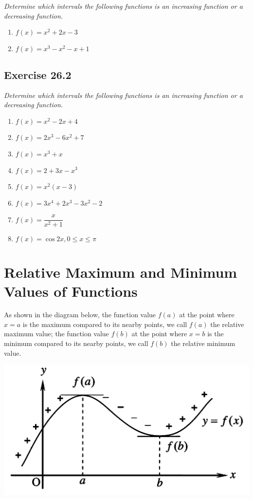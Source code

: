 \documentclass{report}
\begin{document}
\noindent \hspace{1.2em}\textit{
    Determine which intervals the following functions is an increasing function or a decreasing function.
}
\begin{enumerate}
    \item $f(x)=x^2+2 x-3$
    \item $f(x)=x^3-x^2-x+1$
\end{enumerate}

\subsection{Exercise 26.2}

\noindent \hspace{1.2em}\textit{Determine which intervals the following functions is an increasing function or a decreasing function.}
\begin{enumerate}
    \item $f(x)=x^2-2 x+4$
    \item $f(x)=2 x^3-6 x^2+7$
    \item $f(x)=x^3+x$
    \item $f(x)=2+3 x-x^3$
    \item $f(x)=x^2(x-3)$
    \item $f(x)=3 x^4+2 x^3-3 x^2-2$
    \item $f(x)=\dfrac{x}{x^2+1}$
    \item $f(x)=\cos 2 x, 0 \leq x \leq \pi$
\end{enumerate}

\section{Relative Maximum and Minimum Values of Functions}

As shown in the diagram below, the function value $f(a)$ at the point where
$x=a$ is the maximum compared to its nearby points, we call $f(a)$ the relative
maximum value; the function value $f(b)$ at the point where $x=b$ is the
minimum compared to its nearby points, we call $f(b)$ the relative minimum
value.
\begin{center}
    \includegraphics[scale=0.25]{assets/26-6.png}
\end{center}
\end{document}

